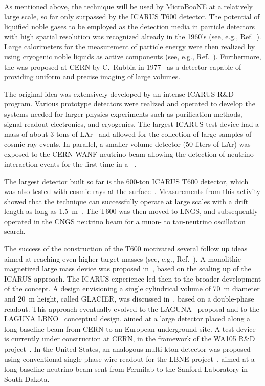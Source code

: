 As mentioned above, the \lartpc technique will be used by MicroBooNE at a relatively large scale, so far only surpassed by the ICARUS T600 detector. The potential of liquified noble gases to be employed as the detection media in particle detectors with high spatial resolution was recognized already in the 1960's (see, e.g., Ref.~\cite{Doke:1993}). Large calorimeters for the measurement of particle energy were then realized by using cryogenic noble liquids as active components (see, e.g., Ref.~\cite{Willis:1974}). Furthermore, the \lartpc was proposed at CERN by C.~Rubbia in 1977~\cite{Rubbia:1977} as a detector capable of providing uniform and precise imaging of large volumes. 

The original \lartpc idea was extensively developed by an intense ICARUS R\&D program. Various prototype detectors were realized and operated to develop the systems needed for larger physics experiments such as purification methods, signal readout electronics, and cryogenics. The largest ICARUS test device had a mass of about 3 tons of LAr~\cite{Benetti:1993-3ton,Cennini:1994-3ton} and allowed for the collection of large samples of cosmic-ray events. In parallel, a smaller volume detector (50 liters of LAr) was exposed to the CERN WANF neutrino beam allowing the detection of neutrino interaction events for the first time in a \lartpc~\cite{Arneodo:1999-50l}. 

The largest \lartpc detector built so far is the 600-ton ICARUS T600 detector, which was also tested with cosmic rays at the surface~\cite{Amerio:2004-T600}. Measurements from this activity showed that the technique can successfully operate at large scales with a drift length as long as 1.5~m~\cite{Amoruso:2004-muon,Amoruso:2004-electron,Antonello:2004-cherenkov,Amoruso:2004-purity,Arneodo:2003-tracks}. The T600 was then moved to LNGS, and subsequently operated in the CNGS neutrino beam for a muon- to tau-neutrino oscillation search. 

The success of the construction of the T600 motivated several follow up ideas aimed at reaching even higher target masses (see, e.g., Ref.~\cite{Aprili:2002-proposal}). A monolithic magnetized large mass device was proposed in~\cite{Cline:2003-LANNDD}, based on the scaling up of the ICARUS approach. The ICARUS experience led then to the broader development of the \lartpc concept. A \lartpc design envisioning a single cylindrical volume of 70~m diameter and 20~m height, called GLACIER, was discussed in~\cite{Rubbia:2004-glacier,Rubbia:2009-glacier}, based on a double-phase readout. This approach eventually evolved to the LAGUNA~\cite{LAGUNAcollab} proposal and to the LAGUNA LBNO~\cite{Stahl:2012-LBNO,Agarwalla:2013-LBNO} conceptual design, aimed at a large detector placed along a long-baseline beam from CERN to an European underground site. A test device is currently under construction at CERN, in the framework of the WA105 R\&D project~\cite{WA105collab}. In the United States, an analogous multi-kton detector was proposed using conventional single-phase wire readout for the LBNE project~\cite{Adams:2013-LBNE}, aimed at a long-baseline neutrino beam sent from Fermilab to the Sanford Laboratory in South Dakota.  

